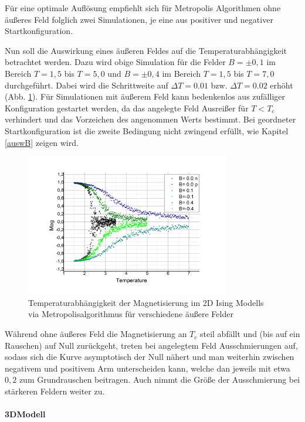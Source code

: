 Für eine optimale Auflösung empfiehlt sich für Metropolis Algorithmen ohne äußeres Feld folglich zwei Simulationen, je eine aus positiver und negativer Startkonfiguration.


Nun soll die Auswirkung eines äußeren Feldes auf die Temperaturabhängigkeit betrachtet werden. Dazu wird obige Simulation für die Felder $B=\pm 0,1$ im Bereich $T=1,5$ bis $T=5,0$ und $B=\pm 0,4$ im Bereich $T=1,5$ bis $T=7,0$ durchgeführt. Dabei wird die Schrittweite auf $\Delta T = 0.01$ bzw. $\Delta T = 0.02$ erhöht (Abb. \ref{mp2db}). Für Simulationen mit äußerem Feld kann bedenkenlos aus zufälliger Konfiguration gestartet werden, da das angelegte Feld Ausreißer für $T<T_{c}$ verhindert und das Vorzeichen des angenommen Werts bestimmt. Bei geordneter Startkonfiguration ist die zweite Bedingung nicht zwingend erfüllt, wie Kapitel \ref{auswB} zeigen wird.
\begin{figure}[H]
	\centering
	\includegraphics[width=0.8\textwidth]{../Graph_Export/MP2D/m(T)_MP2D_50_Plot.jpg}	
	\caption{Temperaturabhängigkeit der Magnetisierung im 2D Ising Modells via Metropolisalgorithmus für verschiedene äußere Felder}
	\label{mp2db}
\end{figure}
Während ohne äußeres Feld die Magnetisierung an $T_{c}$ steil abfällt und (bis auf ein Rauschen) auf Null zurückgeht, treten bei angelegtem Feld Ausschmierungen auf, sodass sich die Kurve asymptotisch der Null nähert und man weiterhin zwischen negativem und positivem Arm unterscheiden kann, welche dan jeweils mit etwa $0,2$ zum Grundrauschen beitragen. Auch nimmt die Größe der Ausschmierung bei stärkeren Feldern weiter zu.


\paragraph{3DModell}

